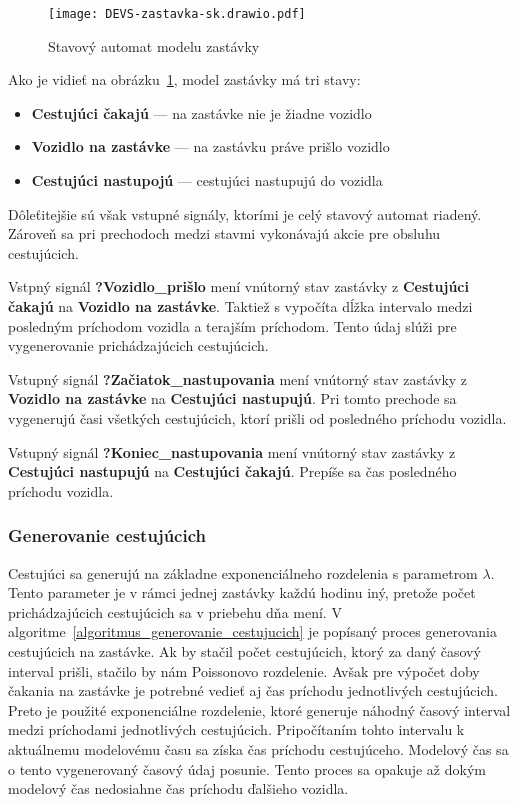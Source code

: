 \begin{figure}[h]\label{fig:model_zastavky}
  \centering
  \texttt{[image: DEVS-zastavka-sk.drawio.pdf]}
  \caption{Stavový automat modelu zastávky}
\end{figure}

Ako je vidieť na obrázku~\ref{fig:model_zastavky}, model zastávky má tri stavy:
\begin{itemize}
  \item \textbf{Cestujúci čakajú} --- na zastávke nie je žiadne vozidlo
  \item \textbf{Vozidlo na zastávke} --- na zastávku práve prišlo vozidlo
  \item \textbf{Cestujúci nastupojú} --- cestujúci nastupujú do vozidla
\end{itemize}

Dôleťitejšie sú však vstupné signály, ktorími je celý stavový automat riadený.
Zároveň sa pri prechodoch medzi stavmi vykonávajú akcie pre obsluhu cestujúcich.

Vstpný signál \textbf{?Vozidlo\_prišlo} mení vnútorný stav zastávky z \textbf{Cestujúci čakajú} na \textbf{Vozidlo na zastávke}.
Taktiež s vypočíta dĺžka intervalo medzi posledným príchodom vozidla a terajším príchodom.
Tento údaj slúži pre vygenerovanie prichádzajúcich cestujúcich.

Vstupný signál \textbf{?Začiatok\_nastupovania} mení vnútorný stav zastávky z \textbf{Vozidlo na zastávke} na \textbf{Cestujúci nastupujú}.
Pri tomto prechode sa vygenerujú časi všetkých cestujúcich, ktorí prišli od posledného príchodu vozidla.

Vstupný signál \textbf{?Koniec\_nastupovania} mení vnútorný stav zastávky z \textbf{Cestujúci nastupujú} na \textbf{Cestujúci čakajú}.
Prepíše sa čas posledného príchodu vozidla.

\subsubsection{Generovanie cestujúcich}

Cestujúci sa generujú na základne exponenciálneho rozdelenia s parametrom $\lambda$.
Tento parameter je v rámci jednej zastávky každú hodinu iný, pretože počet prichádzajúcich cestujúcich sa v priebehu dňa mení.
V algoritme~\ref{algoritmus_generovanie_cestujucich} je popísaný proces generovania cestujúcich na zastávke.
Ak by stačil počet cestujúcich, ktorý za daný časový interval prišli, stačilo by nám Poissonovo rozdelenie.
Avšak pre výpočet doby čakania na zastávke je potrebné vedieť aj čas príchodu jednotlivých cestujúcich.
Preto je použité exponenciálne rozdelenie, ktoré generuje náhodný časový interval medzi príchodami jednotlivých cestujúcich.
Pripočítaním tohto intervalu k aktuálnemu modelovému času sa získa čas príchodu cestujúceho.
Modelový čas sa o tento vygenerovaný časový údaj posunie.
Tento proces sa opakuje až dokým modelový čas nedosiahne čas príchodu ďalšieho vozidla.

